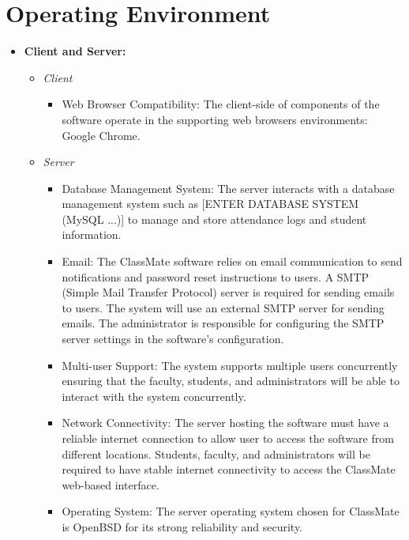 \documentclass[letterpaper,12pt,oneside,listof=totoc]{scrreprt}
\begin{document}
\section{Operating Environment}

\begin{itemize}
\item \textbf{Client and Server:}
        \begin{itemize}
            \item \textit{Client}
            \begin{itemize} 
                \item Web Browser Compatibility: The client-side of components of the software operate in the supporting web browsers environments: Google Chrome.
            \end{itemize}
            \item \textit{Server}
            \begin{itemize}  
                \item Database Management System: The server interacts with a database management system such as [ENTER DATABASE SYSTEM (MySQL ...)] to manage and store attendance logs and student information. 
                \item Email: The ClassMate software relies on email communication to send notifications and password reset instructions to users. A SMTP (Simple Mail Transfer Protocol) server is required for sending emails to users. The system will use an external SMTP server for sending emails. The administrator is responsible for configuring the SMTP server settings in the software's configuration. 
                \item Multi-user Support: The system supports multiple users concurrently ensuring that the faculty, students, and administrators will be able to interact with the system concurrently.
                \item Network Connectivity: The server hosting the software must have a reliable internet connection to allow user to access the software from different locations. Students, faculty, and administrators will be required to have stable internet connectivity to access the ClassMate web-based interface.
                \item Operating System: The server operating system chosen for ClassMate is OpenBSD for its strong reliability and security.

\end{itemize}
\end{itemize}
\end{itemize}
\end{document}
